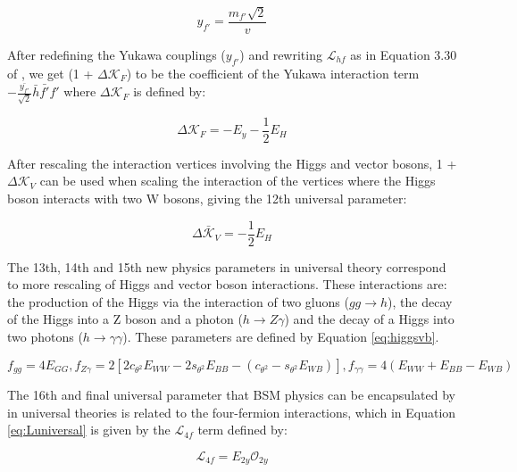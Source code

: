 \documentclass[11pt,oneside,a4paper]{article}
\begin{document}
\begin{equation}
\label{eq:yukawa}
y_{f'} = \frac{m_{f'}\sqrt{2}}{v}
\end{equation}


After redefining the Yukawa couplings ($y_{f'}$) and rewriting $\mathcal{L}_{hf}$ as in Equation 3.30 of \cite{universal}, we get (1 + $\Delta\mathcal{K}_{F}$) to be the coefficient of the Yukawa interaction term $-\frac{\bar{y_{f'}}}{\sqrt{2}}\bar{h}\bar{f'}f'$ where $\Delta\mathcal{K}_{F}$ is defined by:
	
\begin{equation}
\label{eq:param11}
\Delta\mathcal{K}_{F} = -E_{y} - \frac{1}{2}E_{H}
\end{equation}

After rescaling the interaction vertices involving the Higgs and vector bosons, 1 + $\Delta\mathcal{K}_{V}$ can be used when scaling the interaction of the vertices where the Higgs boson interacts with two W bosons, giving the 12th universal parameter:

\begin{equation}
\label{eq:param12}
\Delta\bar{\mathcal{K}}_{V} = - \frac{1}{2}E_{H}
\end{equation}


The 13th, 14th and 15th new physics parameters in universal theory correspond to more rescaling of Higgs and vector boson interactions. These interactions are: the production of the Higgs via the interaction of two gluons ($g g \rightarrow h$), the decay of the Higgs into a Z boson and a photon ($h \rightarrow Z \gamma$) and the decay of a Higgs into two photons ($h \rightarrow \gamma \gamma$). These parameters are defined by Equation \ref{eq:higgsvb}.

\begin{equation}
\label{eq:higgsvb}
f_{gg} = 4E_{GG}, f_{Z\gamma} = 2[2c_{\theta^2}E_{WW} - 2s_{\theta^2}E_{BB} - (c_{\theta^2} - s_{\theta^2}E_{WB})], f_{\gamma \gamma} = 4(E_{WW} + E_{BB} - E_{WB})
\end{equation}

The 16th and final universal parameter that BSM physics can be encapsulated by in universal theories is related to the four-fermion interactions, which in Equation \ref{eq:Luniversal} is given by the $\mathcal{L}_{4f}$ term defined by:

\begin{equation}
\label{eq:param16}
\mathcal{L}_{4f} = E_{2y}\mathcal{O}_{2y}
\end{equation}
\end{document}
